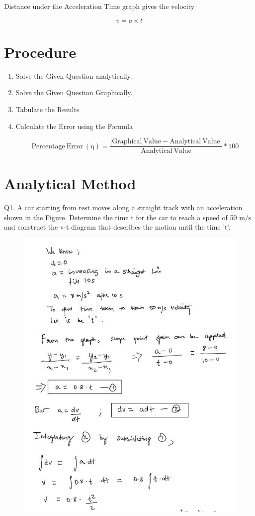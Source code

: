 \documentclass[11pt]{article}
\begin{document}
Distance under the Acceleration Time graph gives the velocity

$$ v = a \times t $$

\section{Procedure}
\begin{enumerate}
	\item Solve the Given Question analytically.
	\item Solve the Given Question Graphically.
	\item Tabulate the Results
	\item Calculate the Error using the Formula
	
		$$\mathrm{Percentage\ Error\ (\eta)} = \dfrac{|\mathrm{Graphical\ Value} - \mathrm{Analytical\ Value}|}{\mathrm{Analytical\ Value}} * 100$$
\end{enumerate}
\pagebreak
\section{Analytical Method}


Q1. A car starting from rest moves along a straight track with an acceleration shown in the Figure. Determine the time t for the car to reach a speed of 50 m/s and construct the v-t diagram that describes the motion until the time 't'.
\begin{figure}[H]
	\includegraphics[scale=0.7]{a11.jpg}
	\label{fig: Polygon Law}
\end{figure}
\end{document}
